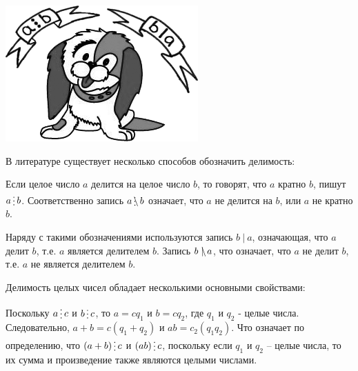 
\begin{floatingfigure}[r]{0.25\textwidth}
	\includegraphics[scale=0.45]{./img/dog}
\end{floatingfigure}
В литературе существует несколько способов обозначить делимость:


Если целое число $a$ делится на целое число $b$, то говорят, что $a$ кратно $b$, пишут $a\del b$. Соответственно запись $a\ndel b$ означает, что $a$ не делится на $b$, или $a$ не кратно $b$. 


Наряду с такими обозначениями используются запись $b~|~a$, означающая, что $a$ делит $b$, т.е. $a$ является делителем $b$. Запись $b~\mathrlap{\backslash}|~a$, что означает, что $a$ не делит $b$, т.е. $a$ не является делителем $b$.


Делимость целых чисел обладает несколькими основными свойствами:





\begin{dok}
    Поскольку $a\del c$ и $b\del c$, то $a = cq_1$ и $b = cq_2$, где $q_1$ и $q_2$ - целые числа. Следовательно,  $a + b = c(q_1 + q_2)$ и $ab = c_2(q_1q_2)$. Что означает по определению, что $(a + b) \del c$ и $(ab) \del c$, поскольку если    $q_1$ и $q_2$ – целые числа, то их сумма и произведение также являются целыми числами. 
\end{dok}

